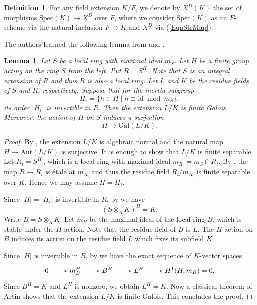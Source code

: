 \documentclass[10pt]{amsart}
\theoremstyle{plain}
\newtheorem{lem}[thm]{Lemma}
\theoremstyle{definition}
\newtheorem{dfn}[thm]{Definition}
\newcommand{\Aut}{\mathrm{Aut}}
\newcommand{\Gal}{\mathrm{Gal}}
\newcommand{\id}{\mathrm{id}}
\newcommand{\Spec}{\mathrm{Spec}}
\begin{document}
\begin{dfn}\label{DefSetRatPts}
For any field extension $K/F$, we denote by $X^D(K)$ the set of morphisms $\Spec(K)\to X^D$ over $F$, where we consider
$\Spec(K)$ as an $F$-scheme via the natural inclusion $F\to K$ and $X^D$ via (\ref{EqnStrMap}). 
\end{dfn}

The authors learned the following lemma from \cite[p.~347]{CES} and \cite[p.~2084]{Ces}.

\begin{lem}\label{LemRingResGalois}
	Let $S$ be a local ring with maximal ideal $m_S$. Let $H$ be a finite group acting on the ring $S$ from the left.
	Put $R=S^H$. Note that $S$ is an integral extension of $R$ and thus $R$ is also a local ring.
	Let $L$ and $K$ be the residue fields of $S$ and $R$, respectively. Suppose that for the inertia subgroup
	\[
	H_i=\{h\in H\mid h\equiv \id \bmod m_S\},
	\]
	its order $|H_i|$ is invertible in $R$. Then the extension $L/K$ is finite Galois. Moreover, the action of $H$ on $S$
	induces a surjection
	\[
	H\to \Gal(L/K).
	\]
\end{lem}
\begin{proof}
	By \cite[Lemma 15.110.9]{Stacks}, the extension $L/K$ is algebraic normal and the natural map $H\to \Aut(L/K)$ is surjective. 
	It is enough to show that $L/K$ is finite separable.
	Let $R_i=S^{H_i}$, which is a local ring with maximal ideal $m_{R_i}=m_S\cap R_i$.
	By \cite[Lemma 58.12.4]{Stacks}, the map $R\to R_i$ is \'{e}tale at $m_{R_i}$ and thus the residue field $R_i/m_{R_i}$
	is finite separable over $K$. Hence we may assume $H=H_i$.
	
	Since $|H|=|H_i|$ is invertible in $R$, 
	by \cite[Proposition A7.1.3 (4)]{KM} we have 
	\[
	(S\otimes_R K)^{H}=K.
	\]
	Write $B=S\otimes_R K$. Let $m_B$ be the maximal ideal of the local ring 
	$B$, which is stable under the $H$-action.
	Note that the residue field of $B$ is $L$.
	The $H$-action on $B$ induces its action on the residue field $L$ which fixes its subfield $K$.
	
	Since $|H|$ is invertible in $B$, by \cite[Ch.~VIII, \S2, Corollary 1]{Serre_Local} we have the exact sequence of $K$-vector spaces
	\[
	\xymatrix{
		0 \ar[r] & m_B^{H}\ar[r] & B^{H}\ar[r] & L^{H}\ar[r] & H^1(H,m_B)=0.
	}
	\]
	Since $B^{H}=K$ and $L^{H}$ is nonzero, we obtain $L^{H}=K$. Now a classical theorem of Artin shows that
	the extension $L/K$ is finite Galois. This concludes the proof. 
\end{proof}
\end{document}
